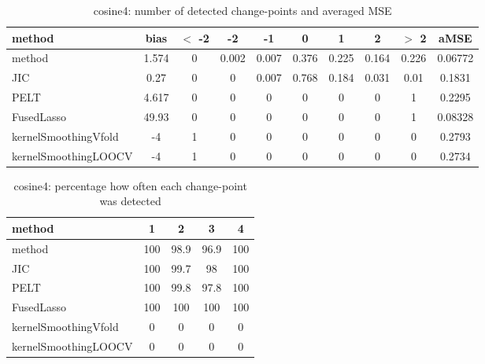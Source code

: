 \begin{table}[ht]
\centering
\begin{tabular}{l|c|ccccccc|c}
  \hline
method & bias & $<$ -2 & -2 & -1 & 0 & 1 & 2 & $>$ 2 & aMSE \\ 
  \hline
method & 1.574 &     0 & 0.002 & 0.007 & 0.376 & 0.225 & 0.164 & 0.226 & 0.06772 \\ 
  JIC &  0.27 &     0 &     0 & 0.007 & 0.768 & 0.184 & 0.031 &  0.01 & 0.1831 \\ 
  PELT & 4.617 &     0 &     0 &     0 &     0 &     0 &     0 &     1 & 0.2295 \\ 
  FusedLasso & 49.93 &     0 &     0 &     0 &     0 &     0 &     0 &     1 & 0.08328 \\ 
  kernelSmoothingVfold &    -4 &     1 &     0 &     0 &     0 &     0 &     0 &     0 & 0.2793 \\ 
  kernelSmoothingLOOCV &    -4 &     1 &     0 &     0 &     0 &     0 &     0 &     0 & 0.2734 \\ 
   \hline
\end{tabular}
\caption{cosine4: number of detected change-points and averaged MSE} 
\label{tab:cosine4Njumps}
\end{table}
\begin{table}[ht]
\centering
\begin{tabular}{l|cccc}
  \hline
method & 1 & 2 & 3 & 4 \\ 
  \hline
method &    100 &   98.9 &   96.9 &    100 \\ 
  JIC &    100 &   99.7 &     98 &    100 \\ 
  PELT &    100 &   99.8 &   97.8 &    100 \\ 
  FusedLasso &    100 &    100 &    100 &    100 \\ 
  kernelSmoothingVfold &      0 &      0 &      0 &      0 \\ 
  kernelSmoothingLOOCV &      0 &      0 &      0 &      0 \\ 
   \hline
\end{tabular}
\caption{cosine4: percentage how often each change-point was detected} 
\label{tab:cosine4Detections}
\end{table}
